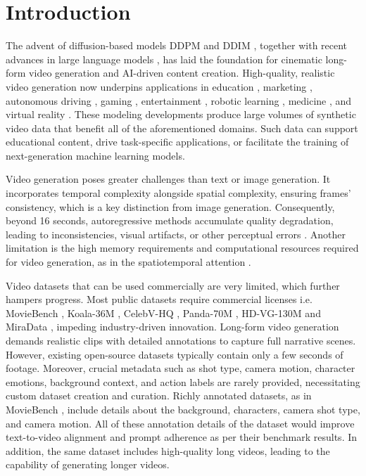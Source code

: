 \section{Introduction}
\label{sec:intro}

The advent of diffusion-based models DDPM \cite{ddpm2020} and DDIM \cite{ddim2020}, together with recent advances in large language models \cite{brown2020language}, has laid the foundation for cinematic long-form video generation and AI-driven content creation. High-quality, realistic video generation now underpins applications in education \cite{wang2023text2video_education}, marketing \cite{zhang2023diffusion_marketing}, autonomous driving \cite{wen2024panacea_autonomous_driving}, gaming \cite{muller2020gamegan}, entertainment \cite{kim2023cinediff}, robotic learning \cite{james2022sim2real}, medicine \cite{xu2020surgical_video_synthesis}, and virtual reality \cite{yang2021vr360}. These modeling developments produce large volumes of synthetic video data that benefit all of the aforementioned domains. Such data can support educational content, drive task-specific applications, or facilitate the training of next-generation machine learning models.

Video generation poses greater challenges than text or image generation. It incorporates temporal complexity alongside spatial complexity, ensuring frames' consistency, which is a key distinction from image generation. Consequently, beyond 16 seconds, autoregressive methods accumulate quality degradation, leading to inconsistencies, visual artifacts, or other perceptual errors \cite{xing2023survey}. Another limitation is the high memory requirements and computational resources required for video generation, as in the spatiotemporal attention \cite{wang2018nonlocal,duke2021sstvos,bertasius2021timesformer}.

Video datasets that can be used commercially are very limited, which further hampers progress. Most public datasets require commercial licenses i.e. MovieBench \cite{moviebench2025}, Koala-36M \cite{wang2024koala36m}, CelebV-HQ \cite{zhu2022celebvhq}, Panda-70M \cite{chen2024panda70m}, HD-VG-130M \cite{videofactory} and MiraData \cite{ju2024miradata}, impeding industry-driven innovation. Long-form video generation demands realistic clips with detailed annotations to capture full narrative scenes. However, existing open-source datasets typically contain only a few seconds of footage. Moreover, crucial metadata such as shot type, camera motion, character emotions, background context, and action labels are rarely provided, necessitating custom dataset creation and curation. Richly annotated datasets, as in MovieBench \cite{moviebench2025}, include details about the background, characters, camera shot type, and camera motion. All of these annotation details of the dataset would improve text-to-video alignment and prompt adherence as per their benchmark results. In addition, the same dataset includes high-quality long videos, leading to the capability of generating longer videos.


